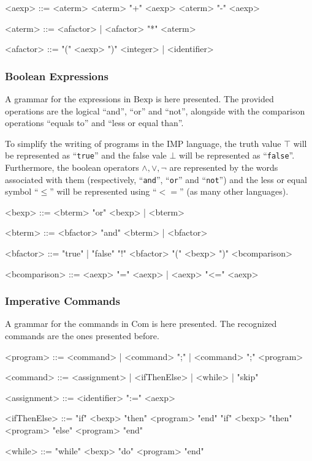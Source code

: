 \documentclass{esposito-documentation}
\begin{document}
\begin{grammar}
	<aexp> ::= <aterm>
	\alt <aterm> "+" <aexp>
	\alt <aterm> "-" <aexp>

	<aterm> ::= <afactor> | <afactor> "*" <aterm>

	<afactor> ::= "(" <aexp> ")"
	\alt <integer> | <identifier>
\end{grammar}

\subsubsection{Boolean Expressions}\label{sec:grammar-bexp}

A grammar for the expressions in $\mathrm{Bexp}$ is here presented. The
provided operations are the logical ``and'', ``or'' and ``not'', alongside with
the comparison operations ``equals to'' and ``less or equal than''.

To simplify the writing of programs in the IMP language, the truth value $\top$
will be represented as ``\texttt{true}'' and the false vale $\bot$ will be
represented as ``\texttt{false}''. Furthermore, the boolean operators $\land,
\vee, \neg$ are represented by the words associated with them (respectively,
``\texttt{and}'', ``\texttt{or}'' and ``\texttt{not}'') and the less or equal
symbol ``$\leq$'' will be represented using ``$<=$'' (as many other languages).

\begin{grammar}
	<bexp> ::= <bterm> "or" <bexp> | <bterm>

	<bterm> ::= <bfactor> "and" <bterm> | <bfactor>

	<bfactor> ::= "true" | "false"
	\alt "!" <bfactor>
	\alt "(" <bexp> ")"
	\alt <bcomparison>

	<bcomparison> ::= <aexp> "=" <aexp> | <aexp> "<=" <aexp>
\end{grammar}

\subsubsection{Imperative Commands}\label{sec:grammar-com}

A grammar for the commands in $\mathrm{Com}$ is here presented. The recognized
commands are the ones presented before.

\begin{grammar}
	<program> ::= <command> | <command> ";" | <command> ";" <program>

	<command> ::= <assignment> | <ifThenElse> | <while> | "skip"

	<assignment> ::= <identifier> ":=" <aexp>

	<ifThenElse> ::= "if" <bexp> "then" <program> "end"
	\alt "if" <bexp> "then" <program> "else" <program> "end"

	<while> ::= "while" <bexp> "do" <program> "end"
\end{grammar}
\end{document}

